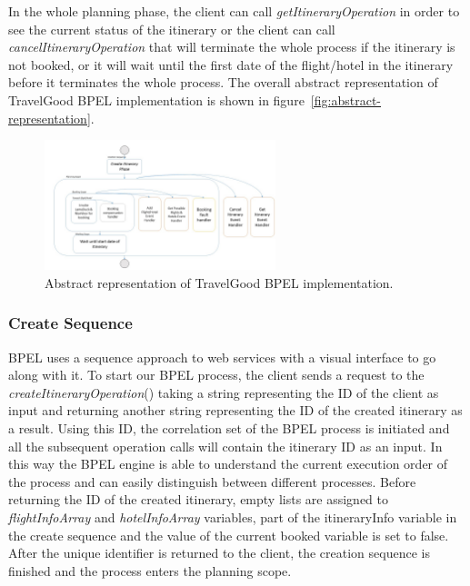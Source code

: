 In the whole planning phase, the client can call \textit{getItineraryOperation} in order to see the current status of the itinerary or the client can call \textit{cancelItineraryOperation} that will terminate the whole process if the itinerary is not booked, or it will wait until the first date of the flight/hotel in the itinerary before it terminates the whole process. The overall abstract representation of TravelGood BPEL implementation is shown in figure~\ref{fig:abstract-representation}.

\begin{figure}[H]
\centering
\includegraphics[width=0.6\textwidth]{images/bpel_abstract_impl.jpg}
\caption{Abstract representation of TravelGood BPEL implementation.} \label{fig:abstract-representation}
\label{statediagram}
\end{figure}

\subsubsection*{Create Sequence}
BPEL uses a sequence approach to web services with a visual interface to go along with it. To start our BPEL process, the client sends a request to the \textit{createItineraryOperation}() taking a string representing the ID of the client as input and returning another string representing the ID of the created itinerary as a result. Using this ID, the correlation set of the BPEL process is initiated and all the subsequent operation calls will contain the itinerary ID as an input. In this way the BPEL engine is able to understand the current execution order of the process and can easily distinguish between different processes. Before returning the ID of the created itinerary, empty lists are assigned  to \textit{flightInfoArray} and \textit{hotelInfoArray} variables, part of the itineraryInfo variable in the create sequence and the value of the current booked variable is set to false. After the unique identifier is returned to the client, the creation sequence is finished and the process enters the planning scope.

